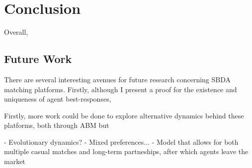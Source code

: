 \section{Conclusion}
\label{sec:section5}
Overall,  

\subsection{Future Work}
There are several interesting avenues for future research concerning SBDA matching platforms. Firstly, although I present a proof for the existence and uniqueness of agent best-responses, 

Firstly, more work could be done to explore alternative dynamics behind these platforms, both through ABM but

- Evolutionary dynamics?
- Mixed preferences...
- Model that allows for both multiple casual matches and  long-term partneships, after which agents leave the market